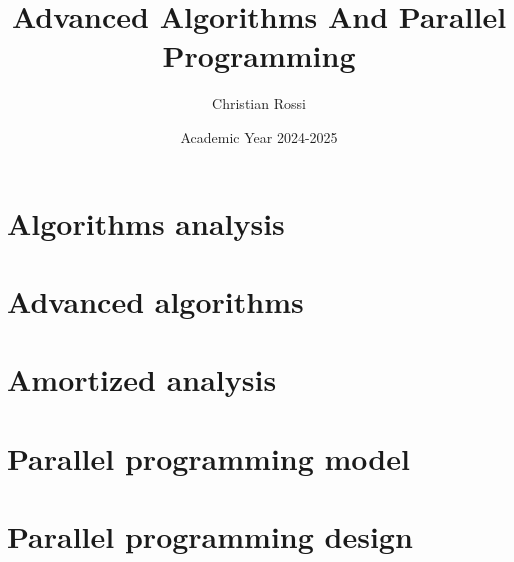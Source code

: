 \documentclass[12pt, a4paper]{report}
\title{\textbf{Advanced Algorithms And Parallel Programming}}
\author{Christian Rossi}
\date{Academic Year 2024-2025}
\begin{document}
    \maketitle

    

    \cleardoublepage

    \tableofcontents

    \cleardoublepage

    \chapter{Algorithms analysis}
    
    
    

    \chapter{Advanced algorithms}
    
    
    
    
    
    
    
    

    \chapter{Amortized analysis}
    
    
    
    

    \chapter{Parallel programming model}
    
    
    
    
    

    \chapter{Parallel programming design}
    
    
    
    
\end{document}
